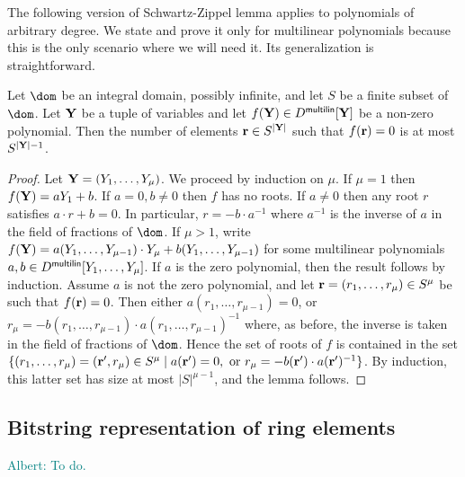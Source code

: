 \documentclass[11pt,letterpaper,usenames,dvipsnames]{article}
\newcommand{\albert}[1]{\textcolor{teal}{Albert: {#1}}}
\begin{document}
The following version of Schwartz-Zippel lemma applies to polynomials of arbitrary degree. We state and prove it only for multilinear polynomials because this is the only scenario where we will need it. Its generalization is straightforward.
\begin{lemma}\label{l: SZ_for_integral_domains}
%
Let $\dom$ be an integral domain, possibly infinite, and let $S$ be a finite subset of $\dom$. Let $\mathbf{Y}$ be a tuple of variables and let $f(\mathbf{Y})\in D^{\mathsf{multilin}}[\mathbf{Y}]$ be a non-zero polynomial. Then the number of elements $\mathbf{r}\in S^{|\mathbf{Y}|}$ such that $f(\mathbf{r})=0$ is at most $S^{|\mathbf{Y}|-1}$. 
%
\end{lemma}
\begin{proof}
Let $\mathbf{Y}=(Y_1,\ldots, Y_\mu)$. We proceed by induction on $\mu$. If $\mu=1$ then $f(\mathbf{Y}) = a Y_1 + b$. If $a=0, b\neq 0$ then $f$ has no roots. If $a\neq 0$ then any root $r$ satisfies $a\cdot r + b = 0$. In particular, $r = -b\cdot a^{-1}$ where $a^{-1}$ is the inverse of $a$ in the field of fractions of $\dom$. If $\mu > 1$, write  $f(\mathbf{Y}) = a(Y_1,\ldots, Y_{\mu-1}) \cdot Y_\mu +  b(Y_1,\ldots, Y_{\mu-1})$ for some multilinear polynomials $a,b\in D^{\mathsf{multilin}}[Y_1,\ldots, Y_\mu]$. If $a$ is the zero polynomial, then the result follows by induction. Assume $a$ is not the zero polynomial, and let  $\mathbf{r}=(r_1,\ldots, r_{\mu}) \in  S^{\mu}$ be such that $f(\mathbf{r})=0$. Then either $a(r_1,\ldots, r_{\mu-1})=0$, or $r_\mu = -b(r_1,\ldots, r_{\mu-1})\cdot a(r_1,\ldots, r_{\mu-1})^{-1}$ where, as before, the inverse is taken in the field of fractions of $\dom$.  Hence the set of roots of $f$  is contained in the set $\{(r_1,\ldots,r_\mu)=(\mathbf{r}',r_\mu) \in S^\mu \mid a(\mathbf{r}')= 0, \text{ or } r_\mu = -b(\mathbf{r}')\cdot a(\mathbf{r}')^{-1}\}$. By induction, this latter set has size at most $|S|^{\mu-1}$, and the lemma follows. 
%
\end{proof}


\subsection{Bitstring representation of ring elements}
\label{sec:bitstring-rep}

\albert{To do.}

\end{document}
